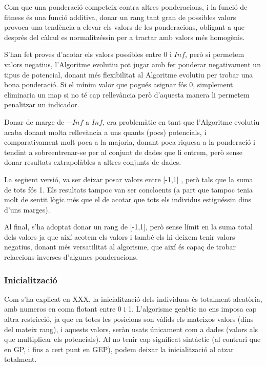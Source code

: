 \documentclass[titlepage,a4paper,12pt]{book}
\begin{document}
Com que una ponderació competeix contra altres ponderacions, i la funció de
fitness és una funció additiva, donar un rang tant gran de possibles valors
provoca una tendència a elevar els valors de les ponderacions, obligant a que
després del càlcul es normalitzéssin per a tractar amb valors més homogènis.

S'han fet proves d'acotar els valors possibles entre 0 i $Inf$, però si
permetem valors negatius, l'Algoritme evolutiu pot jugar amb fer ponderar
negativament un tipus de potencial, donant més flexibilitat al Algoritme
evolutiu per trobar una bona ponderació.  Si el mínim valor que pogués asignar
fós 0, simplement eliminaria un map si no té cap rellevància però d'aquesta
manera li permetem penalitzar un indicador.

Donar de marge de $-Inf$ a $Inf$, era problemàtic en tant que l'Algoritme
evolutiu acaba donant molta rellevància a uns quants (pocs) potencials, i
comparativament molt poca a la majoria, donant poca riquesa a la ponderació i
tendint a sobreentrenar-se per al conjunt de dades que li entrem, però sense
donar resultats extrapolàbles a altres conjunts de dades.

La següent versió, va ser deixar posar valors entre [-1,1] , però tals que la
suma de tots fós 1.  Els resultats tampoc van ser concloents (a part que tampoc
tenia molt de sentit lògic més que el de acotar que tots els individus
estiguéssin dins d'uns marges).

Al final, s'ha adoptat donar un rang de [-1,1], però sense límit en la suma total
dels valors ja que així acotem els valors i també els hi deixem tenir valors
negatius, donant més versatilitat al algorisme, que així és capaç de trobar
relaccions inverses d'algunes ponderacions.



\subsubsection{Inicialització} %
\label{ssub:Inicialitzacio}
Com s'ha explicat en XXX, la inicialització dels individuus és totalment
aleatòria, amb numeros en coma flotant entre 0 i 1.  L'algorisme genètic no ens
imposa cap altra restricció, ja que en totes les posicions son vàlids els
mateixos valors (dins del mateix rang), i aquests valors, seràn usats únicament
com a dades (valors als que multiplicar els potencials).  Al no tenir cap
significat sintàctic (al contrari que en GP, i fins a cert punt en GEP), podem
deixar la inicialització al atzar totalment.
\end{document}
